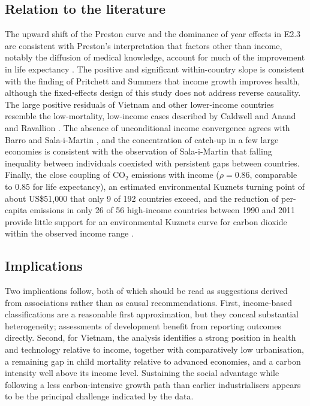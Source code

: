 \documentclass[11pt,a4paper]{article}
\begin{document}
\subsection{Relation to the literature}
The upward shift of the Preston curve and the dominance of year effects in E2.3 are consistent with Preston's interpretation that factors other than income, notably the diffusion of medical knowledge, account for much of the improvement in life expectancy \cite{preston,preston07}. The positive and significant within-country slope is consistent with the finding of Pritchett and Summers \cite{pritchett} that income growth improves health, although the fixed-effects design of this study does not address reverse causality. The large positive residuals of Vietnam and other lower-income countries resemble the low-mortality, low-income cases described by Caldwell \cite{caldwell} and Anand and Ravallion \cite{anand}. The absence of unconditional income convergence agrees with Barro and Sala-i-Martin \cite{barro}, and the concentration of catch-up in a few large economies is consistent with the observation of Sala-i-Martin \cite{sala06} that falling inequality between individuals coexisted with persistent gaps between countries. Finally, the close coupling of CO$_2$ emissions with income ($\rho = 0.86$, comparable to $0.85$ for life expectancy), an estimated environmental Kuznets turning point of about US\$51,000 that only 9 of 192 countries exceed, and the reduction of per-capita emissions in only 26 of 56 high-income countries between 1990 and 2011 provide little support for an environmental Kuznets curve for carbon dioxide within the observed income range \cite{grossman}.

\subsection{Implications}
Two implications follow, both of which should be read as suggestions derived from associations rather than as causal recommendations. First, income-based classifications are a reasonable first approximation, but they conceal substantial heterogeneity; assessments of development benefit from reporting outcomes directly. Second, for Vietnam, the analysis identifies a strong position in health and technology relative to income, together with comparatively low urbanisation, a remaining gap in child mortality relative to advanced economies, and a carbon intensity well above its income level. Sustaining the social advantage while following a less carbon-intensive growth path than earlier industrialisers appears to be the principal challenge indicated by the data.
\end{document}
